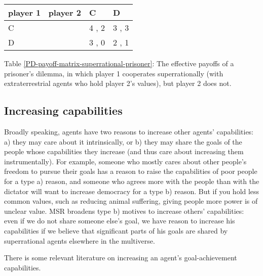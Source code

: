 \begin{longtable}[]{@{}lll@{}}
\toprule
player 1 \ player 2 & C & D\tabularnewline
\midrule
\endhead
C & 4 , 2 & 3 , 3\tabularnewline
D & 3 , 0 & 2 , 1\tabularnewline
\bottomrule
\end{longtable}

Table \ref{PD-payoff-matrix-superrational-prisoner}: The effective payoffs
of a prisoner's dilemma, in which player 1 cooperates superrationally
(with extraterrestrial agents who hold player 2's values), but player 2
does not.

\hypertarget{increasing-capabilities}{\subsection{Increasing
capabilities}\label{increasing-capabilities}}

Broadly speaking, agents have two reasons to increase other agents'
capabilities: a) they may care about it intrinsically, or b) they may
share the goals of the people whose capabilities they increase (and thus
care about increasing them instrumentally). For example, someone who
mostly cares about other people's freedom to pursue their goals has a
reason to raise the capabilities of poor people for a type a) reason,
and someone who agrees more with the people than with the dictator will
want to increase democracy for a type b) reason. But if you hold less
common values, such as reducing animal suffering, giving people more
power is of unclear value. MSR broadens type b) motives to increase
others' capabilities: even if we do not share someone else's goal, we
have reason to increase his capabilities if we believe that significant
parts of his goals are shared by superrational agents elsewhere in the
multiverse.

There is some relevant literature on increasing an agent's
goal-achievement capabilities.

